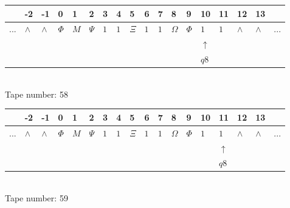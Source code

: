 \documentclass[11pt]{article}
\begin{document}
\begin{table}[H]
\centering
\begin{tabular}{llllllllllllllllll}
 & -2 & -1 & 0 & 1 & 2 & 3 & 4 & 5 & 6 & 7 & 8 & 9 & 10 & 11 & 12 & 13 & \\
\hline
$...$ & \multicolumn{1}{|l|}{$\wedge$} & \multicolumn{1}{|l|}{$\wedge$} & \multicolumn{1}{|l|}{$\Phi$} & \multicolumn{1}{|l|}{$M$} & \multicolumn{1}{|l|}{$\Psi$} & \multicolumn{1}{|l|}{$1$} & \multicolumn{1}{|l|}{$1$} & \multicolumn{1}{|l|}{$\Xi$} & \multicolumn{1}{|l|}{$1$} & \multicolumn{1}{|l|}{$1$} & \multicolumn{1}{|l|}{$\Omega$} & \multicolumn{1}{|l|}{$\Phi$} & \multicolumn{1}{|l|}{$1$} & \multicolumn{1}{|l|}{$1$} & \multicolumn{1}{|l|}{$\wedge$} & \multicolumn{1}{|l|}{$\wedge$} & $...$\\
\hline
&  &  &  &  &  &  &  &  &  &  &  &  & $\uparrow$ &  &  &  &  \\
&  &  &  &  &  &  &  &  &  &  &  &  & $ q8 $ &  &  &  &  \\
\end{tabular}
\\
Tape number: 58
\noindent\makebox[\linewidth]{\hdashrule{\textwidth}{1pt}{1pt}}\end{table}

\begin{table}[H]
\centering
\begin{tabular}{llllllllllllllllll}
 & -2 & -1 & 0 & 1 & 2 & 3 & 4 & 5 & 6 & 7 & 8 & 9 & 10 & 11 & 12 & 13 & \\
\hline
$...$ & \multicolumn{1}{|l|}{$\wedge$} & \multicolumn{1}{|l|}{$\wedge$} & \multicolumn{1}{|l|}{$\Phi$} & \multicolumn{1}{|l|}{$M$} & \multicolumn{1}{|l|}{$\Psi$} & \multicolumn{1}{|l|}{$1$} & \multicolumn{1}{|l|}{$1$} & \multicolumn{1}{|l|}{$\Xi$} & \multicolumn{1}{|l|}{$1$} & \multicolumn{1}{|l|}{$1$} & \multicolumn{1}{|l|}{$\Omega$} & \multicolumn{1}{|l|}{$\Phi$} & \multicolumn{1}{|l|}{$1$} & \multicolumn{1}{|l|}{$1$} & \multicolumn{1}{|l|}{$\wedge$} & \multicolumn{1}{|l|}{$\wedge$} & $...$\\
\hline
&  &  &  &  &  &  &  &  &  &  &  &  &  & $\uparrow$ &  &  &  \\
&  &  &  &  &  &  &  &  &  &  &  &  &  & $ q8 $ &  &  &  \\
\end{tabular}
\\
Tape number: 59
\noindent\makebox[\linewidth]{\hdashrule{\textwidth}{1pt}{1pt}}\end{table}
\clearpage
\end{document}
